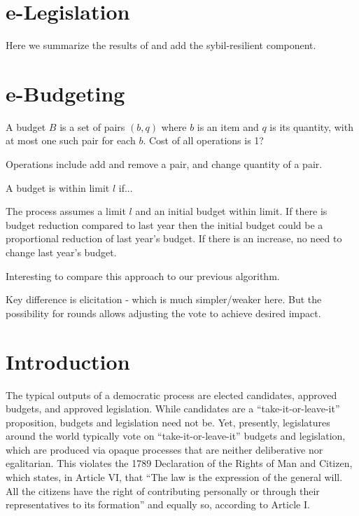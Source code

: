 \documentclass[sigconf]{aamas}  %
\begin{document}
\section{e-Legislation}

Here we summarize the results of \cite{legislation} and add the sybil-resilient component.

\section{e-Budgeting}

A budget $B$ is a set of pairs $(b,q)$ where $b$ is an item and $q$ is its quantity, with at most one such pair for each $b$.
Cost of all operations is 1?

Operations include add and remove a pair, and change quantity of a pair.

A budget is within limit $l$ if...

The process assumes a limit $l$ and an initial budget within limit. If there is budget reduction compared to last year then the initial budget could be a proportional reduction of last year's budget.  If there is an increase, no need to change last year's budget.

Interesting to compare this approach to our previous algorithm.

Key difference is elicitation - which is much simpler/weaker here.
But the possibility for rounds allows adjusting the vote to achieve desired impact.



\pagebreak
\pagebreak


\section{Introduction}\label{section:introduction}


The typical outputs of a democratic process are elected candidates, approved budgets, and approved legislation.  While candidates are a ``take-it-or-leave-it'' proposition, budgets and legislation need not be. Yet, presently, legislatures around the world typically vote on ``take-it-or-leave-it'' budgets and legislation, which are produced via opaque processes that are neither deliberative nor egalitarian.  This violates the 1789 Declaration of the Rights of Man and Citizen, which states, in Article VI, that ``The law is the expression of the general will. All the citizens have the right of contributing personally or through their representatives to its formation'' and equally so, according to Article I.
\end{document}
